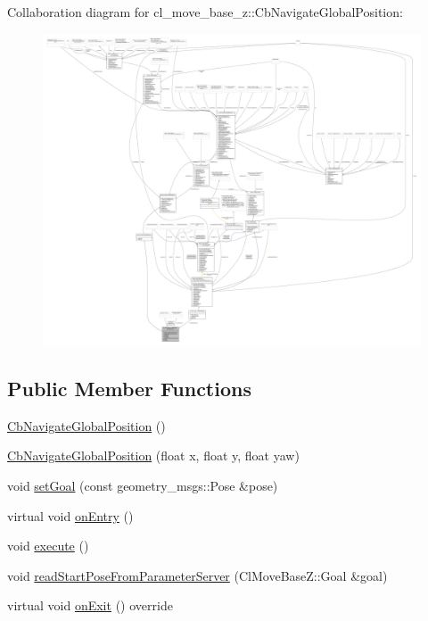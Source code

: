 Collaboration diagram for cl\+\_\+move\+\_\+base\+\_\+z\+:\+:Cb\+Navigate\+Global\+Position\+:
\nopagebreak
\begin{figure}[H]
\begin{center}
\leavevmode
\includegraphics[width=350pt]{classcl__move__base__z_1_1CbNavigateGlobalPosition__coll__graph}
\end{center}
\end{figure}
\subsection*{Public Member Functions}
\begin{DoxyCompactItemize}
\item 
\hyperlink{classcl__move__base__z_1_1CbNavigateGlobalPosition_aec75d2481b2057bbbdad9513c4dc08cd}{Cb\+Navigate\+Global\+Position} ()
\item 
\hyperlink{classcl__move__base__z_1_1CbNavigateGlobalPosition_a79d42c0eeee48af5e73d917fa2d5b4f5}{Cb\+Navigate\+Global\+Position} (float x, float y, float yaw)
\item 
void \hyperlink{classcl__move__base__z_1_1CbNavigateGlobalPosition_a3dc6072628c1e1cdded3d574b3a9766e}{set\+Goal} (const geometry\+\_\+msgs\+::\+Pose \&pose)
\item 
virtual void \hyperlink{classcl__move__base__z_1_1CbNavigateGlobalPosition_a66d8b0555ef2945bc108dcd5171be292}{on\+Entry} ()
\item 
void \hyperlink{classcl__move__base__z_1_1CbNavigateGlobalPosition_a0b8525ea9e4388b27cb1f9b1e06a3b63}{execute} ()
\item 
void \hyperlink{classcl__move__base__z_1_1CbNavigateGlobalPosition_a868b25f238e3781c9a2e44b4e1502fcc}{read\+Start\+Pose\+From\+Parameter\+Server} (Cl\+Move\+Base\+Z\+::\+Goal \&goal)
\item 
virtual void \hyperlink{classcl__move__base__z_1_1CbNavigateGlobalPosition_a5c18268af1e7fc236aa155a58345d5d7}{on\+Exit} () override
\end{DoxyCompactItemize}
